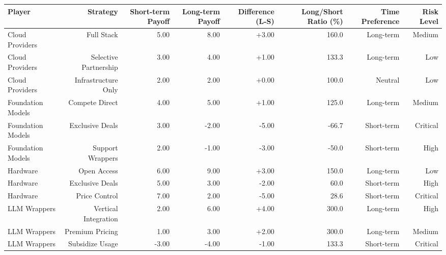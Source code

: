 

\begin{tabular}{@{}lrrrrrrr@{}}
\toprule
Player & Strategy & Short-term Payoff & Long-term Payoff & Difference (L-S) & Long/Short Ratio (\%) & Time Preference & Risk Level \\
\midrule
Cloud Providers & Full Stack & 5.00 & 8.00 & +3.00 & 160.0 & Long-term & Medium \\
Cloud Providers & Selective Partnership & 3.00 & 4.00 & +1.00 & 133.3 & Long-term & Low \\
Cloud Providers & Infrastructure Only & 2.00 & 2.00 & +0.00 & 100.0 & Neutral & Low \\
Foundation Models & Compete Direct & 4.00 & 5.00 & +1.00 & 125.0 & Long-term & Medium \\
Foundation Models & Exclusive Deals & 3.00 & -2.00 & -5.00 & -66.7 & Short-term & Critical \\
Foundation Models & Support Wrappers & 2.00 & -1.00 & -3.00 & -50.0 & Short-term & High \\
Hardware & Open Access & 6.00 & 9.00 & +3.00 & 150.0 & Long-term & Low \\
Hardware & Exclusive Deals & 5.00 & 3.00 & -2.00 & 60.0 & Short-term & High \\
Hardware & Price Control & 7.00 & 2.00 & -5.00 & 28.6 & Short-term & Critical \\
LLM Wrappers & Vertical Integration & 2.00 & 6.00 & +4.00 & 300.0 & Long-term & High \\
LLM Wrappers & Premium Pricing & 1.00 & 3.00 & +2.00 & 300.0 & Long-term & Medium \\
LLM Wrappers & Subsidize Usage & -3.00 & -4.00 & -1.00 & 133.3 & Short-term & Critical \\
\bottomrule
\end{tabular}
